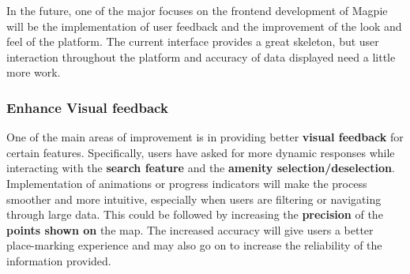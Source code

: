 In the future, one of the major focuses on the frontend development of Magpie will be the implementation of user feedback and the improvement of the look and feel of the platform. The current interface provides a great skeleton, but user interaction throughout the platform and accuracy of data displayed need a little more work.

\subsubsection{Enhance Visual feedback}

One of the main areas of improvement is in providing better \textbf{visual feedback} for certain features. Specifically, users have asked for more dynamic responses while interacting with the \textbf{search feature} and the \textbf{amenity selection/deselection}. Implementation of animations or progress indicators will make the process smoother and more intuitive, especially when users are filtering or navigating through large data. This could be followed by increasing the \textbf{precision} of the \textbf{points shown on} the map. The increased accuracy will give users a better place{-}marking experience and may also go on to increase the reliability of the information provided.

